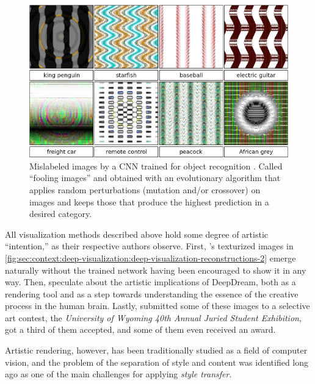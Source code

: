 \begin{figure}[htbp]
  \includegraphics[width=\textwidth]{gfx/deep-visualization-fooling}
  \caption{
    Mislabeled images by a CNN trained for object recognition \cite{Nguyen2014}.
    Called ``fooling images'' and obtained with an evolutionary algorithm that applies random perturbations (mutation and/or crossover) on images and keeps those that produce the highest prediction in a desired category.
  }
  \label{fig:sec:context:deep-visualization:deep-visualization-fooling}
\end{figure}

All visualization methods described above hold some degree of artistic ``intention,'' as their respective authors observe.
First, \citeauthor{Mahendran2014}'s texturized images in \autoref{fig:sec:context:deep-visualization:deep-visualization-reconstructions-2} emerge naturally without the trained network having been encouraged to show it in any way.
Then, \citeauthor{Mordvintsev2015} speculate about the artistic implications of DeepDream, both as a rendering tool and as a step towards understanding the essence of the creative process in the human brain.
Lastly, \citeauthor{Nguyen2014} submitted some of these images to a selective art contest, the \emph{University of Wyoming 40th Annual Juried Student Exhibition}, got a third of them accepted, and some of them even received an award.

Artistic rendering, however, has been traditionally studied as a field of computer vision, and the problem of the separation of style and content was identified long ago as one of the main challenges for applying \emph{style transfer}.



